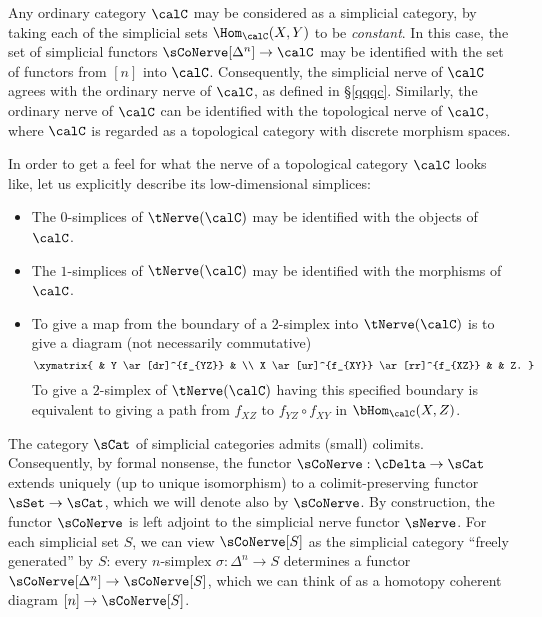 \begin{example}
Any ordinary category $\calC$ may be considered as a simplicial
category, by taking each of the simplicial sets
$\Hom_{\calC}(X,Y)$ to be {\em constant}. In this case, the set of
simplicial functors $\sCoNerve[\Delta^n] \rightarrow \calC$ may be
identified with the set of functors from $[n]$ into $\calC$.
Consequently, the simplicial nerve of $\calC$ agrees with the ordinary nerve of $\calC$, as defined in \S \ref{qqqc}. Similarly, the ordinary nerve of $\calC$ can be identified with the topological nerve of $\calC$, where $\calC$ is regarded as a topological category with discrete morphism spaces.
\end{example}

In order to get a feel for what the nerve of a topological
category $\calC$ looks like, let us explicitly describe its
low-dimensional simplices:

\begin{itemize}
\item The $0$-simplices of $\tNerve(\calC)$ may be identified with
the objects of $\calC$.

\item The $1$-simplices of $\tNerve(\calC)$ may be identified with
the morphisms of $\calC$.

\item To give a map from the boundary of a $2$-simplex into
$\tNerve(\calC)$ is to give a diagram (not necessarily commutative)
$$ \xymatrix{ & Y \ar[dr]^{f_{YZ}} & \\
X \ar[ur]^{f_{XY}} \ar[rr]^{f_{XZ}} & & Z. }$$
To give a $2$-simplex of $\tNerve(\calC)$ having this specified boundary is equivalent to
giving a path from $f_{XZ}$ to $f_{YZ} \circ f_{XY}$ in
$\bHom_{\calC}(X,Z)$.
\end{itemize}

The category $\sCat$ of simplicial categories admits (small)
colimits. Consequently, by formal nonsense, the functor
$\sCoNerve: \cDelta \rightarrow \sCat$ extends uniquely (up to unique isomorphism) to a
colimit-preserving functor $\sSet \rightarrow \sCat$, which we
will denote also by $\sCoNerve$. By construction, the functor
$\sCoNerve$ is left adjoint to the simplicial nerve functor $\sNerve$. For each simplicial set $S$, we can view $\sCoNerve[S]$ as the simplicial category ``freely generated'' by $S$: every $n$-simplex $\sigma: \Delta^n \rightarrow S$ determines a functor $\sCoNerve[\Delta^n] \rightarrow \sCoNerve[S]$, which we can think of as a homotopy coherent diagram $[n] \rightarrow \sCoNerve[S]$. 

